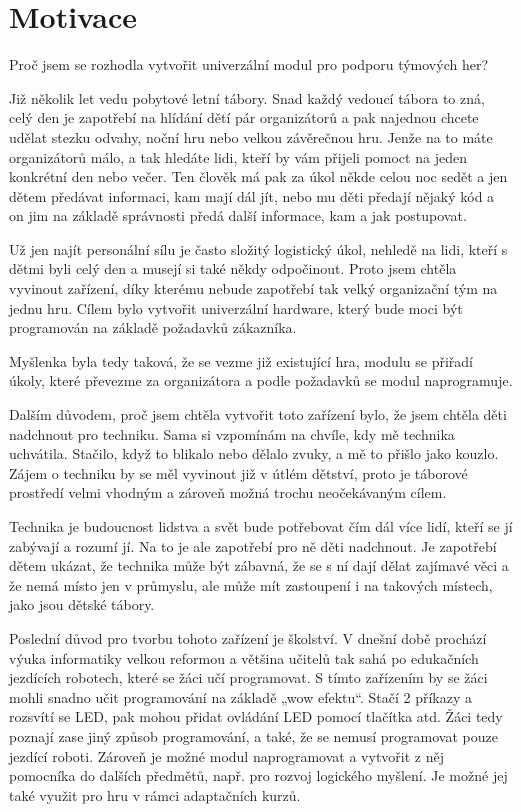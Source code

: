 \chapter{Motivace}
Proč jsem se rozhodla vytvořit univerzální modul pro podporu týmových her? 

Již několik let vedu pobytové letní tábory. Snad každý vedoucí tábora to zná, celý den je zapotřebí na hlídání dětí pár organizátorů 
a pak najednou chcete udělat stezku odvahy, noční hru nebo velkou závěrečnou hru. Jenže na to máte organizátorů málo, a tak hledáte lidi, 
kteří by vám přijeli pomoct na jeden konkrétní den nebo večer. Ten člověk má pak za úkol někde celou noc sedět a jen dětem předávat 
informaci, kam mají dál jít, nebo mu děti předají nějaký kód a on jim na základě správnosti předá další informace, kam a jak postupovat. 

Už jen najít personální sílu je často složitý logistický úkol, nehledě na lidi, kteří s dětmi byli celý den a musejí si také někdy 
odpočinout. Proto jsem chtěla vyvinout zařízení, díky kterému nebude zapotřebí tak velký organizační tým na jednu hru. Cílem bylo vytvořit 
univerzální hardware, který bude moci být programován na základě požadavků zákazníka. 

Myšlenka byla tedy taková, že se vezme již existující hra, modulu se přiřadí úkoly, které převezme za organizátora a podle požadavků se 
 modul naprogramuje. 

Dalším důvodem, proč jsem chtěla vytvořit toto zařízení bylo, že jsem chtěla děti nadchnout pro techniku. Sama si vzpomínám na chvíle, kdy
mě technika uchvátila. Stačilo, když to blikalo nebo dělalo zvuky, a mě to přišlo jako kouzlo. Zájem o techniku by se měl vyvinout již v útlém 
dětství, proto je táborové prostředí velmi vhodným a zároveň možná trochu neočekávaným cílem. 

Technika je budoucnost lidstva a svět bude potřebovat čím dál více lidí, kteří se jí zabývají a rozumí jí. Na to je ale zapotřebí pro ně děti 
nadchnout. Je zapotřebí dětem ukázat, že technika může být zábavná, že se s ní dají dělat zajímavé věci a že nemá místo jen v průmyslu, ale může 
mít zastoupení i na takových místech, jako jsou dětské tábory.  

Poslední důvod pro tvorbu tohoto zařízení je školství. V dnešní době prochází výuka informatiky velkou reformou a většina učitelů tak sahá po 
edukačních jezdících robotech, které se žáci učí programovat. S tímto zařízením by se žáci mohli snadno učit programování na základě „wow efektu“. 
Stačí 2 příkazy a rozsvítí se LED, pak mohou přidat ovládání LED pomocí tlačítka atd. Žáci tedy poznají zase jiný způsob programování, a také, že 
se nemusí programovat pouze jezdící roboti. Zároveň je možné modul naprogramovat a vytvořit z něj pomocníka do dalších předmětů, např. pro rozvoj 
logického myšlení. Je možné jej také využit pro hru v rámci adaptačních kurzů. 

